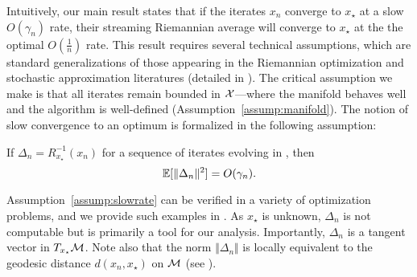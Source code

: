 Intuitively, our main result
states that if the iterates $x_n$ converge to $x_\star$
at a slow $O(\gamma_n)$ rate, their streaming Riemannian average will converge to $x_\star$ at the the optimal $O(\frac{1}{n})$ rate. This result requires  several technical assumptions, which are standard generalizations of those appearing in the Riemannian optimization and stochastic approximation literatures (detailed in ). The critical assumption we make is that all iterates remain bounded in $\mathcal{X}$---where the manifold behaves well and the algorithm is well-defined (Assumption~\ref{assump:manifold}).
The notion of slow convergence to an optimum is formalized in the following assumption:
\vspace*{-6pt}
\begin{assumption}\label{assump:slowrate}
  If $\Delta_n = R_{x_\star}^{-1}(x_n)$ for a sequence of iterates evolving in , then
  \[ \mathbb{E}[\Vert \Delta_n \Vert^2] = O(\gamma_n). \]
\end{assumption}
\vspace*{-4pt}
Assumption~\ref{assump:slowrate} can be verified in a variety of optimization problems, and
we provide such examples in . As $x_\star$ is unknown, $\Delta_n$ is not computable but is primarily a tool for our analysis. Importantly, $\Delta_n$ is a tangent vector in $T_{x_\star} \mathcal{M}$. Note also that the norm $\Vert \Delta_n \Vert$  is locally equivalent to the geodesic distance $d(x_n,x_\star)$ on $\mathcal{M}$ (see ). 


